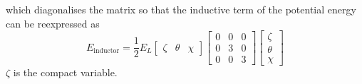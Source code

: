 \documentclass[11pt]{article}
\begin{document}
which diagonalises the matrix so that the inductive term of the potential energy can be reexpressed as
\begin{equation}
E_\text{inductor}
= \frac{1}{2} E_L
\begin{bmatrix}
	\zeta & \theta & \chi
\end{bmatrix}
\begin{bmatrix}
	0 & 0 & 0 \\
	0 & 3 & 0 \\
	0 & 0 & 3
\end{bmatrix}
\begin{bmatrix}
	\zeta \\ \theta \\ \chi
\end{bmatrix}
\end{equation}
$\zeta$ is the compact variable.



\nocite{*}



\end{document}
